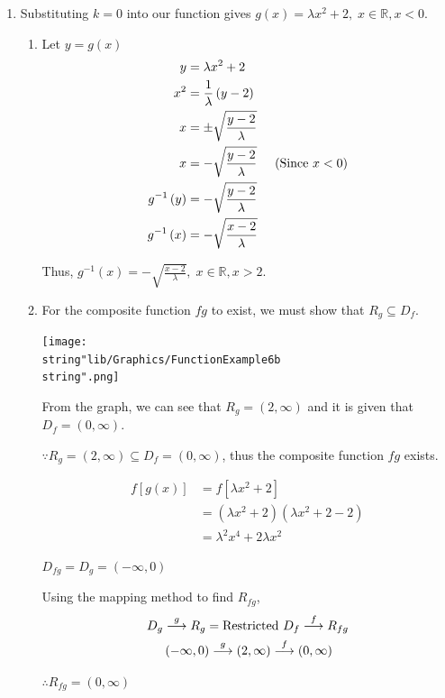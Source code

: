 \documentclass[11pt,a4paper]{book}
\newcommand{\R}{\mathbb{R}}
\begin{document}
\begin{example}{}
\begin{enumerate}[label=(\alph*)]
\item  Substituting $k=0$ into our function gives $g\left(x\right)=\lambda x^{2}+2,\;x\in\R,x<0$.

\begin{enumerate}[label=(\roman*)]

\item Let $y=g\left(x\right)$
\begin{align*}
y & =\lambda x^{2}+2\\
x^{2} & =\frac{1}{\lambda}\left(y-2\right)\\
x & =\pm\sqrt{\frac{y-2}{\lambda}}\\
x & =-\sqrt{\frac{y-2}{\lambda}}\hspace{0.5cm}\text{(Since $x<0$)}\\
g^{-1}\left(y\right) & =-\sqrt{\frac{y-2}{\lambda}}\\
g^{-1}\left(x\right) & =-\sqrt{\frac{x-2}{\lambda}}
\end{align*}


Thus, ${\displaystyle g^{-1}\left(x\right)=-\sqrt{\frac{x-2}{\lambda}},\;x\in\R,x>2}$.

\newpage

\item  For the composite function $fg$ to exist, we must show that
$R_{g}\subseteq D_{f}$.
\begin{center}
\texttt{[image: \\string"lib/Graphics/FunctionExample6b\\string".png]}
\par\end{center}

From the graph, we can see that $R_{g}=\left(2,\infty\right)$ and
it is given that $D_{f}=\left(0,\infty\right)$.

$\because R_{g}=\left(2,\infty\right)\subseteq D_{f}=\left(0,\infty\right)$,
thus the composite function $fg$ exists.

\begin{align*}
f\left[g\left(x\right)\right] & =f\left[\lambda x^{2}+2\right]\\
 & =\left(\lambda x^{2}+2\right)\left(\lambda x^{2}+2-2\right)\\
 & =\lambda^{2}x^{4}+2\lambda x^{2}
\end{align*}

$D_{fg}=D_{g}=\left(-\infty,0\right)$

Using the mapping method to find $R_{fg}$,
\begin{align*}
D_{g} & \overset{g}{\longrightarrow}R_{g}=\text{Restricted \ensuremath{D_{f}}}\overset{f}{\longrightarrow}R_{fg}\\
 & \left(-\infty,0\right)\overset{g}{\longrightarrow}\left(2,\infty\right)\overset{f}{\longrightarrow}\left(0,\infty\right)
\end{align*}

$\therefore R_{fg}=\left(0,\infty\right)$

\end{enumerate}
\end{enumerate}
\end{example}
\end{document}
